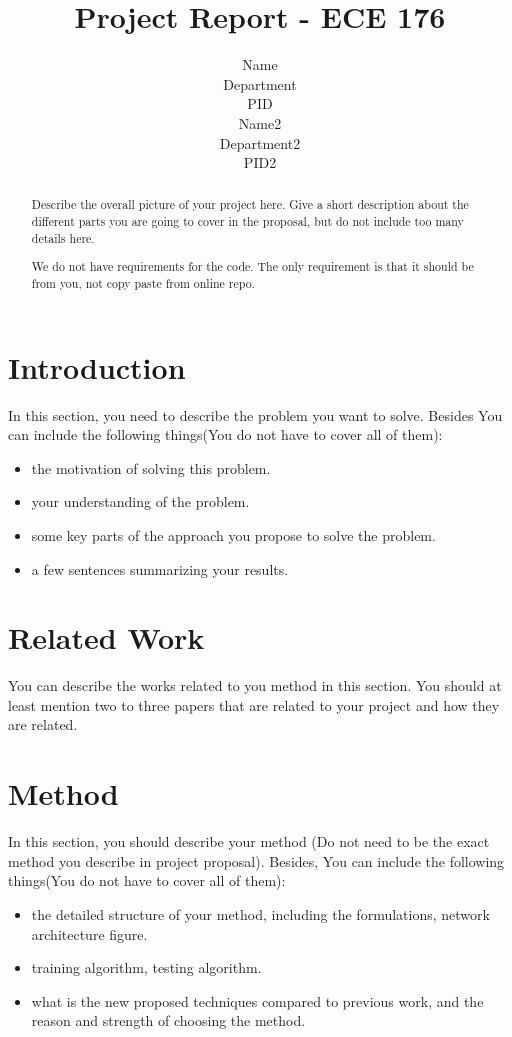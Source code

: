 \documentclass{article}
\title{Project Report - ECE 176}
\author{%
  Name \\
  Department\\
  PID\\
  \And
  Name2 \\
  Department2 \\
  PID2 \\
}
\begin{document}
\maketitle

\begin{abstract}
    Describe the overall picture of your project here. Give a short description about the different parts you are going to cover in the proposal, but do not include too many details here.
    
    We do not have requirements for the code. The only requirement is that it should be from you, not copy paste from online repo.
    

\end{abstract}

\section{Introduction}

In this section, you need to describe the problem you want to solve. Besides You can include the following things(You do not have to cover all of them):
\begin{itemize}
    \item the motivation of solving this problem.
    \item your understanding of the problem.
    \item some key parts of the approach you propose to solve the problem.
    \item a few sentences summarizing your results.
\end{itemize}

\section{Related Work}

You can describe the works related to you method in this section. You should at least mention two to three papers that are related to your project and how they are related.

\section{Method}

In this section, you should describe your method (Do not need to be the exact method you describe in project proposal). Besides, You can include the following things(You do not have to cover all of them): 

\begin{itemize}
    \item the detailed structure of your method, including the formulations, network architecture figure.
    \item training algorithm, testing algorithm.
    \item what is the new proposed techniques compared to previous work, and the reason and strength of choosing the method.
\end{itemize}
\end{document}
